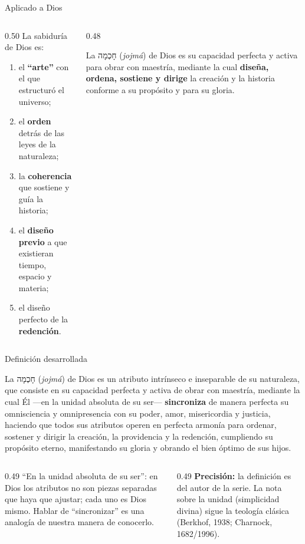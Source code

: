 \documentclass[hyperref={bookmarks=false},aspectratio=169]{beamer}
\newcommand{\heb}[1]{\mbox{\foreignlanguage{hebrew}{#1}}}
\newcommand{\destacar}[1]{\textbf{\textcolor{azul}{#1}}}
\newcommand{\precision}[1]{{\footnotesize\color{gris}\textbf{Precisión:} #1}}
\begin{document}
\begin{frame}{Aplicado a Dios}
\begin{columns}[c,onlytextwidth]
\begin{column}{0.50\textwidth}
\small\RaggedRight La sabiduría de Dios es:
\begin{enumerate}
\item el \destacar{``arte''} con el que estructuró el universo;
\item el \destacar{orden} detrás de las leyes de la naturaleza;
\item la \destacar{coherencia} que sostiene y guía la historia;
\item el \destacar{diseño previo} a que existieran tiempo, espacio y materia;
\item el diseño perfecto de la \destacar{redención}.
\end{enumerate}
\end{column}
\begin{column}{0.48\textwidth}
\begin{tcolorbox}[colback=papiro,colframe=azul,boxrule=1pt,arc=3pt]
\small La \heb{חָכְמָה} (\emph{jojmá}) de Dios es su capacidad perfecta y activa para obrar con maestría, mediante la cual \destacar{diseña, ordena, sostiene y dirige} la creación y la historia conforme a su propósito y para su gloria.
\end{tcolorbox}
\end{column}
\end{columns}
\end{frame}

\begin{frame}{Definición desarrollada}
\begin{tcolorbox}[colback=papiro,colframe=azul,boxrule=1pt,arc=3pt]
\small La \heb{חָכְמָה} (\emph{jojmá}) de Dios es un atributo intrínseco e inseparable de su naturaleza, que consiste en su capacidad perfecta y activa de obrar con maestría, mediante la cual Él ---en la unidad absoluta de su ser--- \destacar{sincroniza} de manera perfecta su omnisciencia y omnipresencia con su poder, amor, misericordia y justicia, haciendo que todos sus atributos operen en perfecta armonía para ordenar, sostener y dirigir la creación, la providencia y la redención, cumpliendo su propósito eterno, manifestando su gloria y obrando el bien óptimo de sus hijos.
\end{tcolorbox}
\begin{columns}[t,onlytextwidth]
\begin{column}{0.49\textwidth}\scriptsize
``En la unidad absoluta de su ser'': en Dios los atributos no son piezas separadas que haya que ajustar; cada uno es Dios mismo. Hablar de ``sincronizar'' es una analogía de nuestra manera de conocerlo.
\end{column}
\begin{column}{0.49\textwidth}
\precision{la definición es del autor de la serie. La nota sobre la unidad (simplicidad divina) sigue la teología clásica (Berkhof, 1938; Charnock, 1682/1996).}
\end{column}
\end{columns}
\end{frame}
\end{document}
